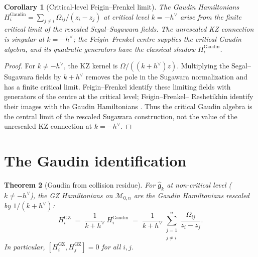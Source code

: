 \documentclass[11pt]{article}
\theoremstyle{plain}
\newtheorem{theorem}{Theorem}[section]
\newtheorem{corollary}[theorem]{Corollary}
\theoremstyle{definition}
\theoremstyle{remark}
\newcommand{\fg}{\mathfrak{g}}
\numberwithin{equation}{section}
\begin{document}
\begin{corollary}[Critical-level Feigin--Frenkel limit]
\label{cor:ffr-critical-limit}
The Gaudin Hamiltonians
$H_i^{\mathrm{Gaudin}} = \sum_{j \neq i} \Omega_{ij}/(z_i - z_j)$
at critical level $k = -h^\vee$ arise from the finite critical limit
of the rescaled Segal--Sugawara fields. The unrescaled KZ connection
is singular at \(k=-h^\vee\); the Feigin--Frenkel centre supplies the
critical Gaudin algebra, and its quadratic generators have the
classical shadow \(H_i^{\mathrm{Gaudin}}\).
\end{corollary}

\begin{proof}
For \(k\neq -h^\vee\), the KZ kernel is
\(\Omega/((k+h^\vee)z)\). Multiplying the Segal--Sugawara fields by
\(k+h^\vee\) removes the pole in the Sugawara normalization and has a
finite critical limit. Feigin--Frenkel identify these limiting fields
with generators of the centre at the critical level; Feigin--Frenkel--
Reshetikhin identify their images with the Gaudin Hamiltonians
\cite{FF92,FFR1994}. Thus the critical Gaudin algebra is the central
limit of the rescaled Sugawara construction, not the value of the
unrescaled KZ connection at \(k=-h^\vee\).
\end{proof}

\section{The Gaudin identification}\label{sec:gaudin}

\begin{theorem}[Gaudin from collision residue]
\label{thm:gaudin-from-collision}
For $\widehat{\fg}_k$ at non-critical level ($k \neq -h^\vee$),
the GZ Hamiltonians on $\mathcal{M}_{0,n}$ are the Gaudin
Hamiltonians rescaled by $1/(k + h^\vee)$:
\begin{equation}\label{eq:gaudin-identification}
 H_i^{\mathrm{GZ}}
 \;=\;
 \frac{1}{k + h^\vee} \,
 H_i^{\mathrm{Gaudin}}
 \;=\;
 \frac{1}{k + h^\vee}
 \sum_{\substack{j=1 \\ j \neq i}}^n
 \frac{\Omega_{ij}}{z_i - z_j}.
\end{equation}
In particular, $[H_i^{\mathrm{GZ}}, H_j^{\mathrm{GZ}}] = 0$ for all
$i, j$.
\end{theorem}
\end{document}
